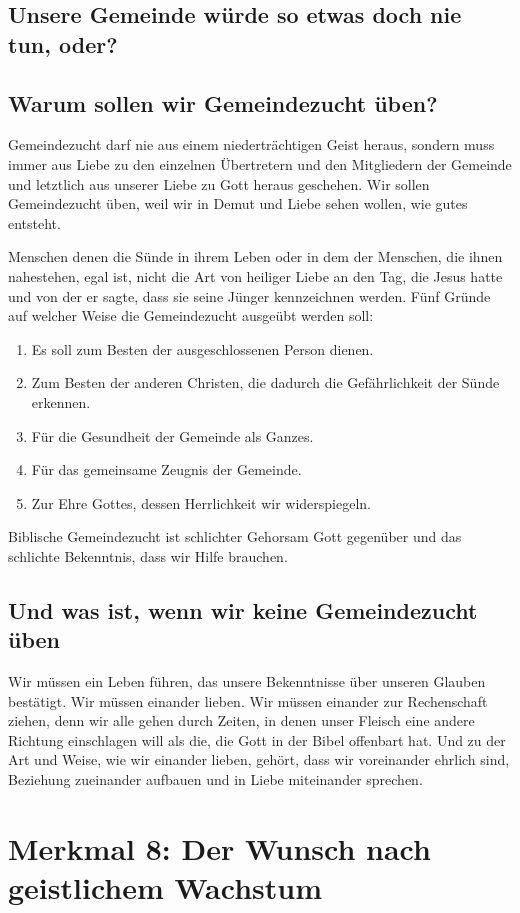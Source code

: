 \documentclass{../../inc/mybib}
\begin{document}
\subsection{Unsere Gemeinde würde so etwas doch nie tun, oder? }
\subsection{Warum sollen wir Gemeindezucht üben? }
Gemeindezucht darf nie aus einem niederträchtigen Geist heraus, sondern muss immer aus Liebe zu den einzelnen Übertretern und den Mitgliedern der Gemeinde und letztlich aus unserer Liebe zu Gott heraus geschehen. Wir sollen Gemeindezucht üben, weil wir in Demut und Liebe sehen wollen, wie gutes entsteht.

Menschen denen die Sünde in ihrem Leben oder in dem der Menschen, die ihnen nahestehen, egal ist, nicht die Art von heiliger Liebe an den Tag, die Jesus hatte und von der er sagte, dass sie seine Jünger kennzeichnen werden.
Fünf Gründe auf welcher Weise die Gemeindezucht ausgeübt werden soll:
\begin{enumerate}
    \item Es soll zum Besten der ausgeschlossenen Person dienen.
    \item Zum Besten der anderen Christen, die dadurch die Gefährlichkeit der Sünde erkennen.
    \item Für die Gesundheit der Gemeinde als Ganzes.
    \item Für das gemeinsame Zeugnis der Gemeinde.
    \item Zur Ehre Gottes, dessen Herrlichkeit wir widerspiegeln.
\end{enumerate}
Biblische Gemeindezucht ist schlichter Gehorsam Gott gegenüber und das schlichte Bekenntnis, dass wir Hilfe brauchen.
\subsection{Und was ist, wenn wir keine Gemeindezucht üben}
Wir müssen ein Leben führen, das unsere Bekenntnisse über unseren Glauben bestätigt. Wir müssen einander lieben. Wir müssen einander zur Rechenschaft ziehen, denn wir alle gehen durch Zeiten, in denen unser Fleisch eine andere Richtung einschlagen will als die, die Gott in der Bibel offenbart hat. Und zu der Art und Weise, wie wir einander lieben, gehört, dass wir voreinander ehrlich sind, Beziehung zueinander aufbauen und in Liebe miteinander sprechen.
\section{Merkmal 8: Der Wunsch nach geistlichem Wachstum}
\end{document}

